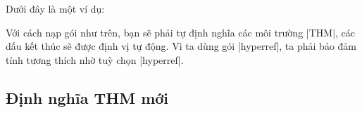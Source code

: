 \documentclass[11pt,oneside]{ltxdoc}
\theoremstyle{marginbreak}
\theoremstyle{changebreak}
\theoremstyle{change}
\theoremstyle{plain}
\theoremstyle{nonumberplain}
\begin{document}
Dưới đây là một ví dụ:
\begin{example}
  \usepackage{hyperref}
  \usepackage[hyperref,thmmarks,noconfig]{ntheorem}
\end{example}
Với cách nạp gói như trên, bạn sẽ phải tự định nghĩa các môi trường |THM|,
các dấu kết thúc sẽ được định vị tự động. Vì ta dùng gói |hyperref|,
ta phải bảo đảm tính tương thích nhờ tuỳ chọn |hyperref|.


\subsection{Định nghĩa THM mới}
\end{document}
